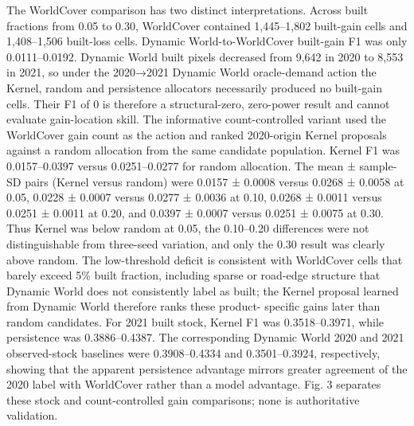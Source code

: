 \documentclass[
]{article}
\newcounter{none} %
\begin{document}
The WorldCover comparison has two distinct interpretations. Across built
fractions from 0.05 to 0.30, WorldCover contained 1,445--1,802
built-gain cells and 1,408--1,506 built-loss cells. Dynamic
World-to-WorldCover built-gain F1 was only 0.0111--0.0192. Dynamic World
built pixels decreased from 9,642 in 2020 to 8,553 in 2021, so under the
2020→2021 Dynamic World oracle-demand action the Kernel, random and
persistence allocators necessarily produced no built-gain cells. Their
F1 of 0 is therefore a structural-zero, zero-power result and cannot
evaluate gain-location skill. The informative count-controlled variant
used the WorldCover gain count as the action and ranked 2020-origin
Kernel proposals against a random allocation from the same candidate
population. Kernel F1 was 0.0157--0.0397 versus 0.0251--0.0277 for
random allocation. The mean ± sample-SD pairs (Kernel versus random)
were 0.0157 ± 0.0008 versus 0.0268 ± 0.0058 at 0.05, 0.0228 ± 0.0007
versus 0.0277 ± 0.0036 at 0.10, 0.0268 ± 0.0011 versus 0.0251 ± 0.0011
at 0.20, and 0.0397 ± 0.0007 versus 0.0251 ± 0.0075 at 0.30. Thus Kernel
was below random at 0.05, the 0.10--0.20 differences were not
distinguishable from three-seed variation, and only the 0.30 result was
clearly above random. The low-threshold deficit is consistent with
WorldCover cells that barely exceed 5\% built fraction, including sparse
or road-edge structure that Dynamic World does not consistently label as
built; the Kernel proposal learned from Dynamic World therefore ranks
these product- specific gains later than random candidates. For 2021
built stock, Kernel F1 was 0.3518--0.3971, while persistence was
0.3886--0.4387. The corresponding Dynamic World 2020 and 2021
observed-stock baselines were 0.3908--0.4334 and 0.3501--0.3924,
respectively, showing that the apparent persistence advantage mirrors
greater agreement of the 2020 label with WorldCover rather than a model
advantage. Fig. 3 separates these stock and count-controlled gain
comparisons; none is authoritative validation.
\end{document}
